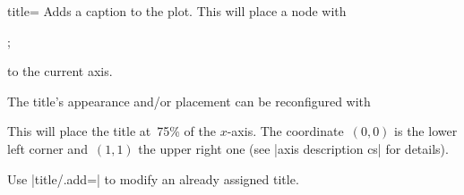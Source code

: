 \begin{pgfplotskey}{title=}
    Adds a caption to the plot. This will place a \Tikz{} node with
\begin{codeexample}
;
\end{codeexample}
    to the current axis.
\begin{codeexample}[]
\end{codeexample}
    The title's appearance and/or placement can be reconfigured with
\begin{codeexample}
\end{codeexample}
    This will place the title at~75\% of the $x$-axis. The coordinate~$(0,0)$
    is the lower left corner and~$(1,1)$ the upper right one (see
    |axis description cs| for details).

    Use |title/.add=| to modify an already assigned
    title.
\end{pgfplotskey}

